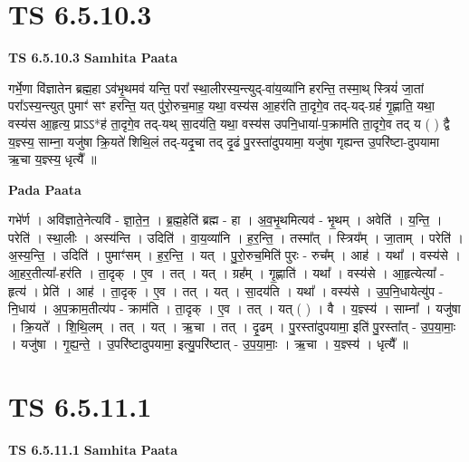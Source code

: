 \documentclass[17pt]{extarticle}
\begin{document}
\section*{ TS 6.5.10.3 }

\textbf{TS 6.5.10.3 } \newline
\textbf{Samhita Paata} \newline

गर्भे॒णा वि॑ज्ञातेन ब्रह्म॒हा ऽव॑भृ॒थमव॑ यन्ति॒ परा᳚ स्था॒लीरस्य॒न्त्युद्-वा॑य॒व्या॑नि हरन्ति॒ तस्मा॒थ् स्त्रियं॑ जा॒तां परा᳚ऽस्य॒न्त्युत् पुमाꣳ॑ सꣳ हरन्ति॒ यत् पु॑रो॒रुच॒माह॒ यथा॒ वस्य॑स आ॒हर॑ति ता॒दृगे॒व तद्-यद्-ग्रहं॑ गृ॒ह्णाति॒ यथा॒ वस्य॑स आ॒हृत्य॒ प्राऽऽ*ह॑ ता॒दृगे॒व तद्-यथ् सा॒दय॑ति॒ यथा॒ वस्य॑स उपनि॒धाया॑-प॒क्राम॑ति ता॒दृगे॒व तद् य ( ) द्वै य॒ज्ञ्स्य॒ साम्ना॒ यजु॑षा क्रि॒यते॑ शिथि॒लं तद्-यदृ॒चा तद् दृ॒ढं पु॒रस्ता॑दुपयामा॒ यजु॑षा गृह्यन्त उ॒परि॑ष्टा-दुपयामा ऋ॒चा य॒ज्ञ्स्य॒ धृत्यै᳚ ॥ \newline

\textbf{Pada Paata} \newline

गभे॑र्ण । अवि॑ज्ञाते॒नेत्यवि॑ - ज्ञा॒ते॒न॒ । ब्र॒ह्म॒हेति॑ ब्रह्म - हा । अ॒व॒भृ॒थमित्यव॑ - भृ॒थम् । अवेति॑ । य॒न्ति॒ । परेति॑ । स्था॒लीः । अस्य॑न्ति । उदिति॑ । वा॒य॒व्या॑नि । ह॒र॒न्ति॒ । तस्मा᳚त् । स्त्रिय᳚म् । जा॒ताम् । परेति॑ । अ॒स्य॒न्ति॒ । उदिति॑ । पुमाꣳ॑सम् । ह॒र॒न्ति॒ । यत् । पु॒रो॒रुच॒मिति॑ पुरः - रुच᳚म् । आह॑ । यथा᳚ । वस्य॑से । आ॒हर॒तीत्या᳚-हर॑ति । ता॒दृक् । ए॒व । तत् । यत् । ग्रह᳚म् । गृ॒ह्णाति॑ । यथा᳚ । वस्य॑से । आ॒हृत्येत्या᳚ - हृत्य॑ । प्रेति॑ । आह॑ । ता॒दृक् । ए॒व । तत् । यत् । सा॒दय॑ति । यथा᳚ । वस्य॑से । उ॒प॒नि॒धायेत्यु॑प - नि॒धाय॑ । अ॒प॒क्राम॒तीत्य॑प - क्राम॑ति । ता॒दृक् । ए॒व । तत् । यत् ( ) । वै । य॒ज्ञ्स्य॑ । साम्ना᳚ । यजु॑षा । क्रि॒यते᳚ । शि॒थि॒लम् । तत् । यत् । ऋ॒चा । तत् । दृ॒ढम् । पु॒रस्ता॑दुपयामा॒ इति॑ पु॒रस्ता᳚त् - उ॒प॒या॒माः॒ । यजु॑षा । गृ॒ह्य॒न्ते॒ । उ॒परि॑ष्टादुपयामा॒ इत्यु॒परि॑ष्टात् - उ॒प॒या॒माः॒ । ऋ॒चा । य॒ज्ञ्स्य॑ । धृत्यै᳚ ॥  \newline




\section*{ TS 6.5.11.1 }

\textbf{TS 6.5.11.1 } \newline
\textbf{Samhita Paata} \newline
\end{document}
